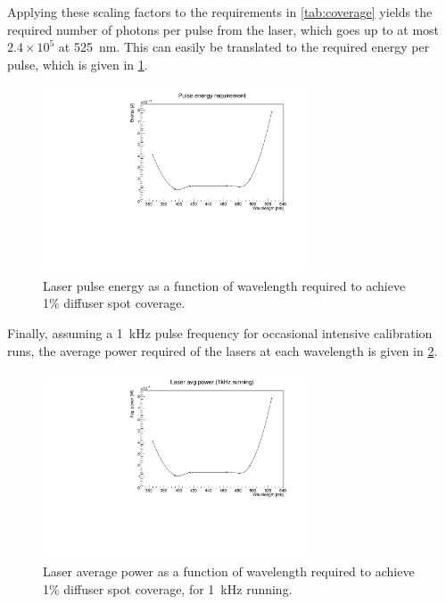 \documentclass[a4paper,11pt]{article}
\begin{document}
Applying these scaling factors to the requirements in \cref{tab:coverage} yields the required number of photons per pulse from the laser, which goes up to at most $2.4\times10^5$ at 525~nm. This can easily be translated to the required energy per pulse, which is given in \cref{fig:laserenergy}.
\begin{figure}
\centering
\includegraphics[width=0.7\textwidth]{pulseEnergyReq.pdf}
\caption{Laser pulse energy as a function of wavelength required to achieve 1\% diffuser spot coverage.}\label{fig:laserenergy}
\end{figure}
Finally, assuming a 1~kHz pulse frequency for occasional intensive calibration runs, the average power required of the lasers at each wavelength is given in \cref{fig:laserpower}.
\begin{figure}
\centering
\includegraphics[width=0.7\textwidth]{avgPowerReq.pdf}
\caption{Laser average power as a function of wavelength required to achieve 1\% diffuser spot coverage, for 1~kHz running.}\label{fig:laserpower}
\end{figure}
\end{document}

